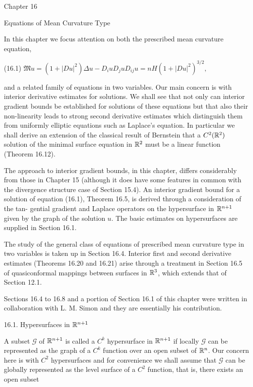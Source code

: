 

Chapter 16

Equations of Mean Curvature Type

In this chapter we focus attention on both the prescribed mean curvature equation,

(16.1) \qquad $\mathfrak{M}u=(1+|Du|^2)\Delta u-D_i uD_j uD_{ij}u=nH(1+|Du|^2)^{3/2},$

and a related family of equations in two variables. Our main concern is with
interior derivative estimates for solutions. We shall see that not only can interior
gradient bounds be established for solutions of these equations but that also their
non-linearity leads to strong second derivative estimates which distinguish them
from uniformly elliptic equations such as Laplace's equation. In particular we shall
derive an extension of the classical result of Bernstein that a $C^2(\mathbb{R}^2)$ solution of the
minimal surface equation in $\mathbb{R}^2$ must be a linear function (Theorem 16.12).

The approach to interior gradient bounds, in this chapter, differs considerably
from those in Chapter 15 (although it does have some features in common with the
divergence structure case of Section 15.4). An interior gradient bound for a solution
of equation (16.1), Theorem 16.5, is derived through a consideration of the tan-
gential gradient and Laplace operators on the hypersurface in $\mathbb{R}^{n+1}$ given by the
graph of the solution $u$. The basic estimates on hypersurfaces are supplied in
Section 16.1.

The study of the general class of equations of prescribed mean curvature type in
two variables is taken up in Section 16.4. Interior first and second derivative
estimates (Theorems 16.20 and 16.21) arise through a treatment in Section 16.5 of
quasiconformal mappings between surfaces in $\mathbb{R}^3$, which extends that of Section
12.1.

Sections 16.4 to 16.8 and a portion of Section 16.1 of this chapter were written
in collaboration with L. M. Simon and they are essentially his contribution.

\medskip

16.1. Hypersurfaces in $\mathbb{R}^{n+1}$

 A subset $\mathcal G$ of $\mathbb{R}^{n+1}$ is called a $C^k$ hypersurface in $\mathbb{R}^{n+1}$ if locally $\mathcal G$ can be represented
as the graph of a $C^k$ function over an open subset of $\mathbb{R}^n$. Our concern here is with
$C^2$ hypersurfaces and for convenience we shall assume that $\mathcal G$ can be globally
represented as the level surface of a $C^2$ function, that is, there exists an open subset
